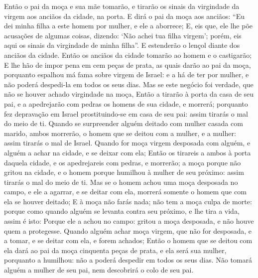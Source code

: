 {{  Então o pai da moça e sua mãe tomarão, e tirarão os sinais da virgindade da virgem aos anciãos da cidade, na porta.
  E dirá o pai da moça aos anciãos: \enquote{Eu dei minha filha a este homem por mulher, e ele a aborrece;
  E, eis que, ele lhe põe acusações de algumas coisas, dizendo: \enquote*{Não achei tua filha virgem}; porém, eis aqui os sinais da virgindade de minha filha}. E estenderão o lençol diante dos anciãos da cidade.
  Então os anciãos da cidade tomarão ao homem e o castigarão;
  E lhe hão de impor pena em cem peças de prata, as quais darão ao pai da moça, porquanto espalhou má fama sobre virgem de Israel: e a há de ter por mulher, e não poderá despedi-la em todos os seus dias.
  Mas se este negócio foi verdade, que não se houver achado virgindade na moça,
  Então a tirarão à porta da casa de seu pai, e a apedrejarão com pedras os homens de sua cidade, e morrerá; porquanto fez depravação em Israel prostituindo-se em casa de seu pai: assim tirarás o mal do meio de ti.
  Quando se surpreender alguém deitado com mulher casada com marido, ambos morrerão, o homem que se deitou com a mulher, e a mulher: assim tirarás o mal de Israel.
  Quando for moça virgem desposada com alguém, e alguém a achar na cidade, e se deixar com ela;
  Então os tirareis a ambos à porta daquela cidade, e os apedrejareis com pedras, e morrerão; a moça porque não gritou na cidade, e o homem porque humilhou à mulher de seu próximo: assim tirarás o mal do meio de ti.
  Mas se o homem achou uma moça desposada no campo, e ele a agarrar, e se deitar com ela, morrerá somente o homem que com ela se houver deitado;
  E à moça não farás nada; não tem a moça culpa de morte: porque como quando alguém se levanta contra seu próximo, e lhe tira a vida, assim é isto:
  Porque ele a achou no campo: gritou a moça desposada, e não houve quem a protegesse.
  Quando alguém achar moça virgem, que não for desposada, e a tomar, e se deitar com ela, e forem achados;
  Então o homem que se deitou com ela dará ao pai da moça cinquenta peças de prata, e ela será sua mulher, porquanto a humilhou: não a poderá despedir em todos os seus dias.
  Não tomará alguém a mulher de seu pai, nem descobrirá o colo de seu pai}.
\par }


